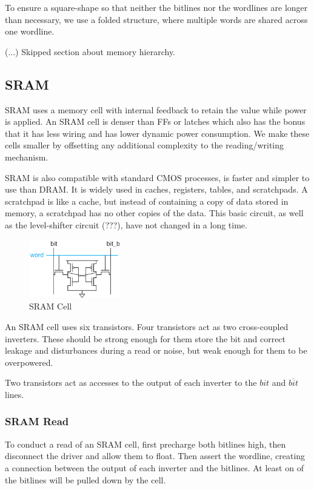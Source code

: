 \documentclass{article}
\begin{document}
To ensure a square-shape so that neither the bitlines nor the wordlines are longer than necessary, we use a folded structure, where multiple words are shared across one wordline. 

(...) Skipped section about memory hierarchy.

\subsection{SRAM}

SRAM uses a memory cell with internal feedback to retain the value while power is applied. An SRAM cell is denser than FFs or latches which also has the bonus that it has less wiring and has lower dynamic power consumption. We make these cells smaller by offsetting any additional complexity to the reading/writing mechanism.

SRAM is also compatible with standard CMOS processes, is faster and simpler to use than DRAM. It is widely used in caches, registers, tables, and scratchpads. A scratchpad is like a cache, but instead of containing a copy of data stored in memory, a scratchpad has no other copies of the data. This basic circuit, as well as the level-shifter circuit (???), have not changed in a long time.

\begin{figure}[ht!]
\centering
\includegraphics[width=40mm]{SRAM.png}
\caption{SRAM Cell}
\end{figure}

An SRAM cell uses six transistors. Four transistors act as two cross-coupled inverters. These should be strong enough for them store the bit and correct leakage and disturbances during a read or noise, but weak enough for them to be overpowered. 

Two transistors act as accesses to the output of each inverter to the $bit$ and $\overline{bit}$ lines. 

\subsubsection{SRAM Read}

To conduct a read of an SRAM cell, first precharge both bitlines high, then disconnect the driver and allow them to float. Then assert the wordline, creating a connection between the output of each inverter and the bitlines. At least on of the bitlines will be pulled down by the cell. 
\end{document}
